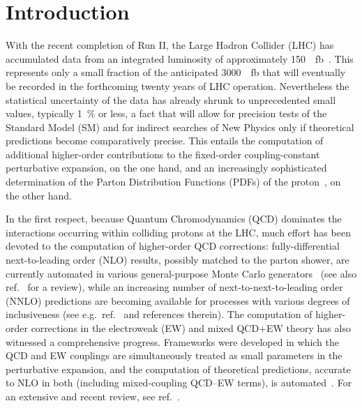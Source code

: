\section{Introduction}
\label{sec:introduction}

With the recent completion of Run II, the Large Hadron Collider (LHC) has 
accumulated data from an integrated luminosity of approximately 
\SI{150}{\per\femto\barn}~\cite{Mangano:2020icy}. This represents only a small fraction of
the anticipated \SI{3000}{\per\femto\barn} that will eventually be recorded in the
forthcoming twenty years of LHC operation. Nevertheless the statistical 
uncertainty of the data has already shrunk to unprecedented small values,
typically \SI{1}{\percent} or less, a fact that will allow for precision tests of the
Standard Model (SM) and for indirect searches of New Physics only if 
theoretical predictions become comparatively precise. This entails the 
computation of additional higher-order contributions to the fixed-order 
coupling-constant perturbative expansion, on the one hand, and an increasingly 
sophisticated determination of the Parton Distribution Functions (PDFs) of the 
proton~\cite{Gao:2017yyd,Ethier:2020way}, on the other hand. 

In the first respect, because Quantum Chromodynamics (QCD) dominates the 
interactions occurring within colliding protons at the LHC, much effort 
has been devoted to the computation of higher-order QCD corrections: 
fully-differential next-to-leading order (NLO) results, possibly matched to the
parton shower, are currently automated in various general-purpose
Monte Carlo generators~\cite{Gleisberg:2008ta,Alwall:2014hca,Bellm:2015jjp}
(see also ref.~\cite{Buckley:2011ms} for a review),
while an increasing number of next-to-next-to-leading order (NNLO) predictions 
are becoming available for processes with various degrees of inclusiveness
(see e.g.\ ref.~\cite{Amoroso:2020lgh} and references therein). The computation
of higher-order corrections in the electroweak (EW) and mixed QCD+EW theory has
also witnessed a comprehensive progress. Frameworks 
were developed in which the QCD and EW couplings are simultaneously treated as 
small parameters in the perturbative expansion, and the computation of 
theoretical predictions, accurate to NLO in both (including mixed-coupling 
QCD--EW terms), is automated~\cite{Kallweit:2014xda,Biedermann:2017yoi,Frederix:2018nkq}. For an extensive and recent review, see ref.~\cite{Denner:2019vbn}.

